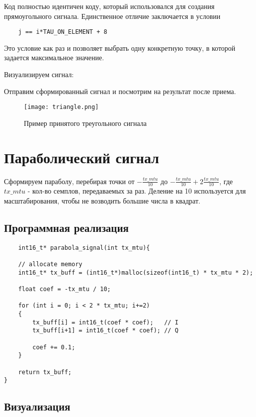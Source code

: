 Код полностью идентичен коду, который использовался для создания прямоугольного сигнала. Единственное отличие заключается в условии

\begin{lstlisting}
    j == i*TAU_ON_ELEMENT + 8
\end{lstlisting}

Это условие как раз и позволяет выбрать одну конкретную точку, в которой задается максимальное значение.

Визуализируем сигнал:



Отправим сформированный сигнал и посмотрим на результат после приема.

\begin{figure}[H]
    \centering
    \texttt{[image: triangle.png]}
    \caption{Пример принятого треугольного сигнала}
\end{figure}

\section*{\textbf{Параболический сигнал}}

Сформируем параболу, перебирая точки от $-\frac{tx\_mtu}{10}$ до $-\frac{tx\_mtu}{10} + 2\frac{tx\_mtu}{10}$, где $tx\_mtu$ - кол-во семплов,
передаваемых за раз. Деление на 10 используется для масштабирования, чтобы не возводить большие числа в квадрат.

\subsection*{\textbf{Программная реализация}}

\begin{lstlisting}
    int16_t* parabola_signal(int tx_mtu){

    // allocate memory
    int16_t* tx_buff = (int16_t*)malloc(sizeof(int16_t) * tx_mtu * 2);

    float coef = -tx_mtu / 10;

    for (int i = 0; i < 2 * tx_mtu; i+=2)
    {
        tx_buff[i] = int16_t(coef * coef);   // I
        tx_buff[i+1] = int16_t(coef * coef); // Q

        coef += 0.1;
    }

    return tx_buff;
}
\end{lstlisting}

\subsection*{\textbf{Визуализация}}

